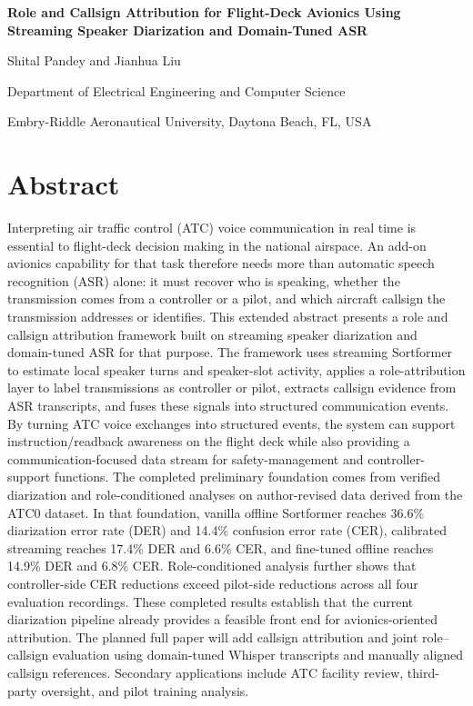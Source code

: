 \documentclass[10pt]{article}
\begin{document}
\begin{center}
{\Large\bfseries Role and Callsign Attribution for Flight-Deck Avionics Using Streaming Speaker Diarization and Domain-Tuned ASR\par}
\vspace{0.75em}
{\large Shital Pandey and Jianhua Liu\par}
\vspace{0.2em}
{\normalsize Department of Electrical Engineering and Computer Science\par}
{\normalsize Embry-Riddle Aeronautical University, Daytona Beach, FL, USA\par}
\end{center}
\vspace{0.45em}

\section*{Abstract}

Interpreting air traffic control (ATC) voice communication in real time is essential to flight-deck decision making in the national airspace. An add-on avionics capability for that task therefore needs more than automatic speech recognition (ASR) alone: it must recover who is speaking, whether the transmission comes from a controller or a pilot, and which aircraft callsign the transmission addresses or identifies. This extended abstract presents a role and callsign attribution framework built on streaming speaker diarization and domain-tuned ASR for that purpose. The framework uses streaming Sortformer to estimate local speaker turns and speaker-slot activity, applies a role-attribution layer to label transmissions as controller or pilot, extracts callsign evidence from ASR transcripts, and fuses these signals into structured communication events. By turning ATC voice exchanges into structured events, the system can support instruction/readback awareness on the flight deck while also providing a communication-focused data stream for safety-management and controller-support functions. The completed preliminary foundation comes from verified diarization and role-conditioned analyses on author-revised data derived from the ATC0 dataset. In that foundation, vanilla offline Sortformer reaches 36.6\% diarization error rate (DER) and 14.4\% confusion error rate (CER), calibrated streaming reaches 17.4\% DER and 6.6\% CER, and fine-tuned offline reaches 14.9\% DER and 6.8\% CER. Role-conditioned analysis further shows that controller-side CER reductions exceed pilot-side reductions across all four evaluation recordings. These completed results establish that the current diarization pipeline already provides a feasible front end for avionics-oriented attribution. The planned full paper will add callsign attribution and joint role--callsign evaluation using domain-tuned Whisper transcripts and manually aligned callsign references. Secondary applications include ATC facility review, third-party oversight, and pilot training analysis.
\end{document}
